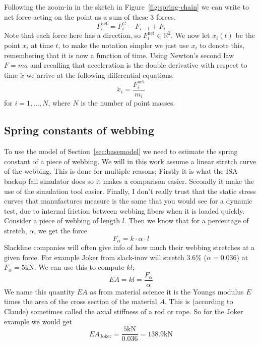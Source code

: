 \documentclass[a4paper,10pt]{article}
\newcommand{\R}{\mathbb{R}}
\newcommand{\fnet}{F^{\text{net}}}
\newcommand{\ddx}{\ddot{x}}
\newcommand{\kN}{\text{kN}}
\begin{document}
Following the zoom-in in the sketch in Figure~\ref{fig:spring-chain} we can write to net force acting on the point as a sum of these 3 forces. 
%
\begin{equation}
   \label{eq:netforce}
   F_i^{\text{net}} = F_i^G -F_{i-1} + F_i
\end{equation}
%
Note that each force here has a direction, so \(F_i^{\text{net}} \in \R^2\). We now let \(x_i(t)\) be the point \(x_i\) at time \(t\), to make the notation simpler we just use \(x_i\) to denote this, remembering that it is now a function of time. Using Newton's second law \(F = m a\) and recalling that acceleration is the double derivative with respect to time \(\ddx\) we arrive at the following differential equations:
%
\begin{equation}
   \label{eq:ode}
   \ddx_i = \frac{\fnet_i }{m_i} 
\end{equation}
%
for \(i = 1, \hdots, N\), where \(N\) is the number of point masses.
%

\subsection{Spring constants of webbing}%
\label{sub:kwebbing}

To use the model of Section~\ref{sec:basemodel} we need to estimate the spring constant of a piece of webbing. 
%
We will in this work assume a linear stretch curve of the webbing. This is done for multiple reasons; Firstly it is what the ISA backup fall simulator does so it makes a comparison easier. Secondly it make the use of the simulation tool easier. Finally, I don't really trust that the static stress curves that manufactures measure is the same that you would see for a dynamic test, due to internal friction between webbing fibers when it is loaded quickly.
%
Consider a piece of webbing of length $l$. Then we know that for a percentage of stretch, $\alpha$, we get the force
%
\begin{equation}
   F_{\alpha} = k \cdot \alpha \cdot l
\end{equation}
%
Slackline companies will often give info of how much their webbing stretches at a given force. For example Joker from slack-inov will stretch $3.6\%$ ($\alpha = 0.036$) at $F_{\alpha}=5\kN$. We can use this to compute $kl$;
%
\begin{equation}
   EA = kl = \frac{F_{\alpha}}{\alpha}
\end{equation}
%
We name this quantity $EA$ as from material science it is the Youngs modulus $E$ times the area of the cross section of the material $A$. This is (according to Claude) sometimes called the axial stiffness of a rod or rope. 
% 
So for the Joker example we would get $$EA_{\text{Joker}} = \frac{5\kN}{0.036} = 138.9\kN$$
\end{document}
